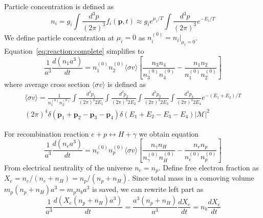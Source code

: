 \documentclass[12pt]{extarticle}
\numberwithin{problem}{section}
\numberwithin{theorem}{section}
\begin{document}
	Particle concentration is defined as
	\begin{equation}
		n_i = g_i\int\frac{d^3p}{(2\pi)^3} f_i(\mathbf{p}, t)\approx g_ie^{\mu_i/T}\int\frac{d^3p}{(2\pi)^3} e^{-E_i / T}
	\end{equation}
	We define particle concentration at $\mu_i = 0$ as $n^{(0)}_i = n_i|_{\mu_i = 0}$. Equation~\ref{eq:reaction:complete} simplifies to
	\begin{equation}
		\frac{1}{a^3}\frac{d(n_1a^3)}{dt} = n_1^{(0)}n_2^{(0)}\langle\sigma v\rangle\left[\frac{n_3 n_4}{n^{(0)}_3 n^{(0)}_4} - \frac{n_1 n_2}{n^{(0)}_1 n^{(0)}_2}\right]
	\end{equation}
	where average cross section $\langle\sigma v\rangle$ is defined as
	\begin{multline}
		\langle\sigma v\rangle = \frac{1}{n_1^{(0)}n_2^{(0)}}\int\frac{d^3p_1}{(2\pi)^3 2E_1}\int\frac{d^3p_2}{(2\pi)^3 2E_2}\int\frac{d^3p_3}{(2\pi)^3 2E_3}\int\frac{d^3p_4}{(2\pi)^3 2E_4} e^{-(E_1 + E_2) / T}\\
		(2\pi)^4\delta(\mathbf{p}_1 + \mathbf{p}_2 - \mathbf{p}_3 - \mathbf{p}_4)\delta(E_1 + E_2 - E_3 - E_4)|\mathcal{M}|^2
	\end{multline}

	For recombination reaction $e + p\leftrightarrow H + \gamma$ we obtain equation
	\begin{equation}
		\frac{1}{a^3}\frac{d(n_ea^3)}{dt} = n_e^{(0)}n_p^{(0)}\langle\sigma v\rangle\left[\frac{n_\gamma n_H}{n^{(0)}_\gamma n^{(0)}_H} - \frac{n_e n_p}{n^{(0)}_e n^{(0)}_p}\right]
	\end{equation}
	From electrical neutrality of the universe $n_e = n_p$. Define free electron fraction as $X_e = n_e / (n_e + n_H) = n_p / (n_p + n_H)$. Since total mass in a comoving volume $m_p(n_p + n_H)a^3 = m_p n_b a^3$ is saved, we can rewrite left part as
	\begin{equation}
		\frac{1}{a^3}\frac{d(X_e(n_p + n_H)a^3)}{dt} = \frac{a^3(n_p + n_H)}{a^3}\frac{dX_e}{dt} = n_b\frac{dX_e}{dt}
	\end{equation}
\end{document}
